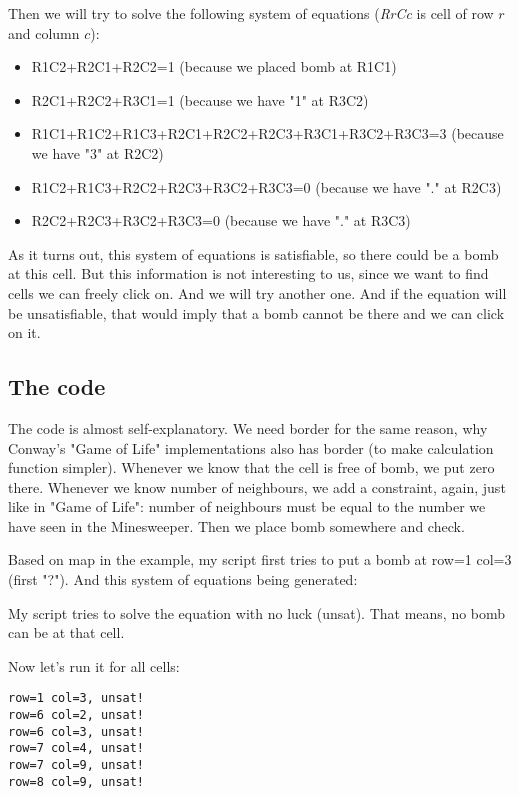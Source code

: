 Then we will try to solve the following system of equations (\emph{RrCc} is cell of row $r$ and column $c$):

\begin{itemize}
\item R1C2+R2C1+R2C2=1                               (because we placed bomb at R1C1)	
\item R2C1+R2C2+R3C1=1                               (because we have "1" at R3C2)	
\item R1C1+R1C2+R1C3+R2C1+R2C2+R2C3+R3C1+R3C2+R3C3=3 (because we have "3" at R2C2)	
\item R1C2+R1C3+R2C2+R2C3+R3C2+R3C3=0                (because we have "." at R2C3)	
\item R2C2+R2C3+R3C2+R3C3=0                          (because we have "." at R3C3)
\end{itemize}

As it turns out, this system of equations is satisfiable, so there could be a bomb at this cell.
But this information is not interesting to us, since we want to find cells we can freely click on.
And we will try another one.
And if the equation will be unsatisfiable, that would imply that a bomb cannot be there and we can click on it.

\subsection{The code}



The code is almost self-explanatory.
We need border for the same reason, why Conway's "Game of Life" implementations also has border (to make calculation
function simpler).
Whenever we know that the cell is free of bomb, we put zero there.
Whenever we know number of neighbours, we add a constraint, again, just like in "Game of Life": number of neighbours must be equal to the number we have seen in the Minesweeper.
Then we place bomb somewhere and check.

Based on map in the example, my script first tries to put a bomb at row=1 col=3 (first "?").
And this system of equations being generated:



My script tries to solve the equation with no luck (unsat). That means, no bomb can be at that cell.

Now let's run it for all cells:

\begin{lstlisting}
row=1 col=3, unsat!
row=6 col=2, unsat!
row=6 col=3, unsat!
row=7 col=4, unsat!
row=7 col=9, unsat!
row=8 col=9, unsat!
\end{lstlisting}

